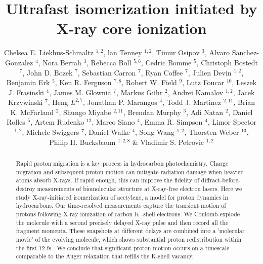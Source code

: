 \documentclass[10pt]{article}
\title{Ultrafast isomerization initiated by X-ray core ionization }
\author{Chelsea E. Liekhus-Schmaltz ${ }^{1,2}$, lan Tenney ${ }^{1,2}$, Timur Osipov ${ }^{3}$, Alvaro Sanchez-Gonzalez ${ }^{4}$, Nora Berrah ${ }^{3}$, Rebecca Boll ${ }^{5,6}$, Cedric Bomme ${ }^{5}$, Christoph Bostedt ${ }^{7}$, John D. Bozek ${ }^{7}$, Sebastian Carron ${ }^{7}$, Ryan Coffee ${ }^{7}$, Julien Devin ${ }^{1,2}$, Benjamin Erk ${ }^{5}$, Ken R. Ferguson ${ }^{7,8}$, Robert W. Field ${ }^{9}$, Lutz Foucar ${ }^{10}$, Leszek J. Frasinski ${ }^{4}$, James M. Glownia ${ }^{7}$, Markus Gühr ${ }^{2}$, Andrei Kamalov ${ }^{1,2}$, Jacek Krzywinski ${ }^{7}$, Heng $L^{2,7}$, Jonathan P. Marangos ${ }^{4}$, Todd J. Martinez ${ }^{2,11}$, Brian K. McFarland ${ }^{2}$, Shungo Miyabe ${ }^{2,11}$, Brendan Murphy ${ }^{3}$, Adi Natan ${ }^{2}$, Daniel Rolles ${ }^{5}$, Artem Rudenko ${ }^{12}$, Marco Siano ${ }^{4}$, Emma R. Simpson ${ }^{4}$, Limor Spector ${ }^{1,2}$, Michele Swiggers ${ }^{7}$, Daniel Walke ${ }^{4}$, Song Wang ${ }^{1,2}$, Thorsten Weber ${ }^{13}$, Philip H. Bucksbaum ${ }^{1,2,8}$ \& Vladimir S. Petrovic ${ }^{1,2}$}
\date{}
\begin{document}
\maketitle
\captionsetup{singlelinecheck=false}


\begin{abstract}
Rapid proton migration is a key process in hydrocarbon photochemistry. Charge migration and subsequent proton motion can mitigate radiation damage when heavier atoms absorb X-rays. If rapid enough, this can improve the fidelity of diffract-before-destroy measurements of biomolecular structure at X-ray-free electron lasers. Here we study X-ray-initiated isomerization of acetylene, a model for proton dynamics in hydrocarbons. Our time-resolved measurements capture the transient motion of protons following X-ray ionization of carbon K -shell electrons. We Coulomb-explode the molecule with a second precisely delayed X-ray pulse and then record all the fragment momenta. These snapshots at different delays are combined into a 'molecular movie' of the evolving molecule, which shows substantial proton redistribution within the first 12 fs . We conclude that significant proton motion occurs on a timescale comparable to the Auger relaxation that refills the K-shell vacancy.
\end{abstract}
\end{document}
